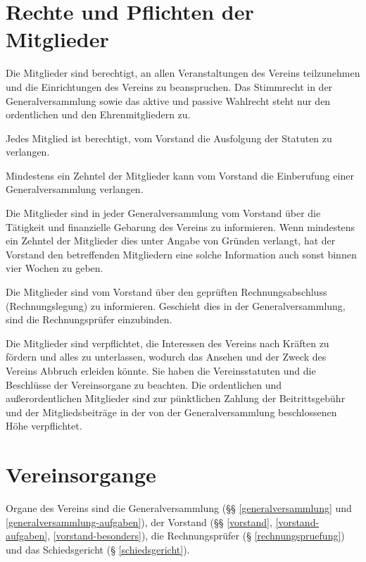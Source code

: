 \documentclass{article}
\begin{document}
\section{Rechte und Pflichten der Mitglieder}
\begin{absatz}
    \item Die Mitglieder sind berechtigt, an allen Veranstaltungen des Vereins teilzunehmen und die Einrichtungen des Vereins zu beanspruchen. Das Stimmrecht in der Generalversammlung sowie das aktive und passive Wahlrecht steht nur den ordentlichen und den Ehrenmitgliedern zu.
    \item Jedes Mitglied ist berechtigt, vom Vorstand die Ausfolgung der Statuten zu verlangen.
    \item Mindestens ein Zehntel der Mitglieder kann vom Vorstand die Einberufung einer Generalversammlung verlangen.
    \item Die Mitglieder sind in jeder Generalversammlung vom Vorstand über die Tätigkeit und finanzielle Gebarung des Vereins zu informieren. Wenn mindestens ein Zehntel der Mitglieder dies unter Angabe von Gründen verlangt, hat der Vorstand den betreffenden Mitgliedern eine solche Information auch sonst binnen vier Wochen zu geben.
    \item Die Mitglieder sind vom Vorstand über den geprüften Rechnungsabschluss (Rechnungslegung) zu informieren. Geschieht dies in der Generalversammlung, sind die Rechnungsprüfer einzubinden.
    \item Die Mitglieder sind verpflichtet, die Interessen des Vereins nach Kräften zu fördern und alles zu unterlassen, wodurch das Ansehen und der Zweck des Vereins Abbruch erleiden könnte. Sie haben die Vereinsstatuten und die Beschlüsse der Vereinsorgane zu beachten. Die ordentlichen und außerordentlichen Mitglieder sind zur pünktlichen Zahlung der Beitrittsgebühr und der Mitgliedsbeiträge in der von der Generalversammlung beschlossenen Höhe verpflichtet.
\end{absatz}



\section{Vereinsorgange}
Organe des Vereins sind die Generalversammlung (§§ \ref{generalversammlung} und \ref{generalversammlung-aufgaben}), der Vorstand (§§ \ref{vorstand}, \ref{vorstand-aufgaben}, \ref{vorstand-besonders}), die Rechnungsprüfer (§ \ref{rechnungspruefung}) und das Schiedsgericht (§ \ref{schiedsgericht}).
\end{document}
